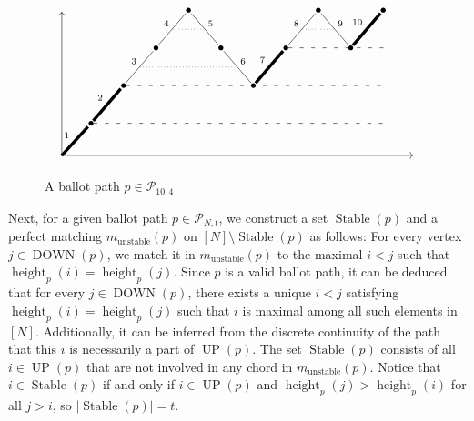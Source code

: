 \documentclass[ALCO]{cedram}
\newcommand{\Stable}{\operatorname{Stable}}
\newcommand{\height}{\operatorname{height}}
\newcommand{\UP}{\operatorname{UP}}
\newcommand{\DOWN}{\operatorname{DOWN}}
\newcommand{\Pcal}{\mathcal{P}}
\begin{document}
\begin{figure}
    \centering
    \[\begin{tikzcd}[column sep=small]
	{} &&&& \bullet &&&& \bullet && \bullet \\
	&&& \bullet && \bullet && \bullet && \bullet & {} \\
	&& \bullet &&&& \bullet &&&& {} \\
	& \bullet &&&&&&&&& {} \\
	{} &&&&&&&&&&& {}
	\arrow[shorten >= -5pt, shorten <= -5pt, "2", no head, from=4-2, to=3-3, line width=2.5pt]
	\arrow[shorten >= -5pt, shorten <= -5pt, ""{name=0, anchor=center, inner sep=0}, "3", no head, from=3-3, to=2-4]
	\arrow[shorten >= -5pt, shorten <= -5pt, ""{name=1, anchor=center, inner sep=0}, "4", no head, from=2-4, to=1-5]
	\arrow[shorten >= -5pt, shorten <= -5pt, ""{name=2, anchor=center, inner sep=0}, "6", no head, from=2-6, to=3-7]
	\arrow[shorten >= -5pt, shorten <= -5pt, "7", no head, from=3-7, to=2-8, line width=2.5pt]
	\arrow[shorten >= -5pt, shorten <= -5pt, ""{name=3, anchor=center, inner sep=0}, "8", no head, from=2-8, to=1-9]
	\arrow[shorten >= -5pt, shorten <= -5pt, ""{name=4, anchor=center, inner sep=0}, "9", no head, from=1-9, to=2-10]
	\arrow[shorten >= -5pt, shorten <= -5pt, "10", no head, from=2-10, to=1-11, line width=2.5pt]
	\arrow[shorten >= -5pt, shorten <= -5pt, from=5-1, to=5-12]
	\arrow[shorten >= -5pt, shorten <= -2pt, from=5-1, to=1-1]
	\arrow[shorten >= -5pt, shorten <= -5pt, ""{name=5, anchor=center, inner sep=0}, "5", no head, from=1-5, to=2-6]
	\arrow[shorten >= -5pt, shorten <= -2pt, "1", no head, from=5-1, to=4-2, line width=2.5pt]
	\arrow[shorten >= -5pt, shorten <= -5pt, loosely dashed, no head, from=4-2, to=4-11]
	\arrow[shorten >= -5pt, shorten <= -5pt, loosely dashed, no head, from=3-3, to=3-11]
	\arrow[shorten >= -5pt, shorten <= -5pt, loosely dashed, no head, from=2-8, to=2-11]
	\arrow[dotted, no head, from=0, to=2]
	\arrow[dotted, no head, from=3, to=4]
	\arrow[dotted, no head, from=1, to=5]
    \end{tikzcd}\]
    \caption{A ballot path $p  \in \Pcal_{10,4}$}
    \label{fig:ballot path example}
\end{figure}

Next, for a given ballot path $p \in \Pcal_{N,t}$, we construct a set $\Stable(p)$ and a perfect matching $m_{\text{unstable}}(p)$ on $[N]\setminus\Stable(p)$ as follows: For every vertex $j \in \DOWN(p)$, we match it in $m_{\text{unstable}}(p)$ to the maximal $i < j$ such that $\height_p(i)=\height_p(j)$. Since $p$ is a valid ballot path, it can be deduced that for every $j \in \DOWN(p)$, there exists a unique $i<j$ satisfying $\height_p(i)=\height_p(j)$ such that $i$ is maximal among all such elements in $[N]$. Additionally, it can be inferred from the discrete continuity of the path that this $i$ is necessarily a part of $\UP(p)$. The set $\Stable(p)$ consists of all $i \in \UP(p)$ that are not involved in any chord in $m_{\text{unstable}}(p)$. Notice that $i \in \Stable(p)$ if and only if $i \in \UP(p)$ and $\height_p(j) > \height_p(i)$ for all $j>i$, so $\left|\Stable(p)\right| = t$.
\end{document}
